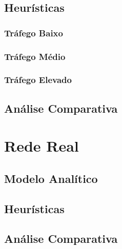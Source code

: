 \vspace{11pt}

\subsection{Heurísticas}
\label{heuResults}
\vspace{11pt}

\subsubsection{Tráfego Baixo}

\subsubsection{Tráfego Médio}

\subsubsection{Tráfego Elevado}



\subsection{Análise Comparativa}


\clearpage
\section{Rede Real}
\label{heu}

\subsection{Modelo Analítico}

\subsection{Heurísticas}

\subsection{Análise Comparativa}


\cleardoublepage